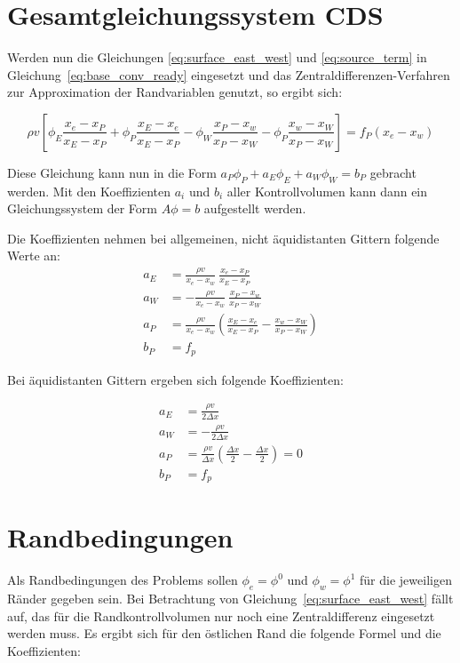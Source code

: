 \documentclass[11pt, ngerman,colorback,accentcolor=tud2d]{tudreport}
\begin{document}
\section{Gesamtgleichungssystem CDS}

Werden nun die Gleichungen \eqref{eq:surface_east_west} und \eqref{eq:source_term}
in Gleichung~\eqref{eq:base_conv_ready} eingesetzt und das Zentraldifferenzen-Verfahren
zur Approximation der Randvariablen genutzt, so ergibt sich:

\begin{equation*}
  \rho v \left[{\phi_E \frac{x_e-x_P}{x_E-x_P} + \phi_P \frac{x_E-x_e}{x_E-x_P}
  -\phi_W \frac{x_P-x_w}{x_P-x_W} - \phi_P \frac{x_w-x_W}{x_P-x_W}
  }\right]
  = f_P(x_e-x_w)
\end{equation*}

Diese Gleichung kann nun in die Form $a_P \phi_P + a_E \phi_E + a_W \phi_W = b_P$
gebracht werden. Mit den Koeffizienten $a_i$ und $b_i$ aller Kontrollvolumen kann
dann ein Gleichungssystem der Form $A\phi = b$ aufgestellt werden.

Die Koeffizienten nehmen bei allgemeinen, nicht äquidistanten Gittern folgende Werte
an:
\begin{align*}
  a_E &= \frac{\rho v}{x_e-x_w}\ \frac{x_e-x_P}{x_E-x_P}\\
  a_W &=-\frac{\rho v}{x_e-x_w}\ \frac{x_P-x_w}{x_P-x_W}\\
  a_P &= \frac{\rho v}{x_e-x_w} \left({\frac{x_E-x_e}{x_E-x_P}
-\frac{x_w-x_W}{x_P-x_W}}\right)\\
  b_P &= f_p
\end{align*}


Bei äquidistanten Gittern ergeben sich folgende Koeffizienten:

\begin{align*}
  a_E &= \frac{\rho v}{2\Delta x}\\
  a_W &=-\frac{\rho v}{2\Delta x}\\
  a_P &= \frac{\rho v}{\Delta x} \left({\frac{\Delta x}{2}
-\frac{\Delta x}{2}}\right) = 0\\
  b_P &= f_p
\end{align*}


\section{Randbedingungen}

Als Randbedingungen des Problems sollen $\phi_e = \phi^0$ und $\phi_w = \phi^1$ für die jeweiligen
Ränder gegeben sein. Bei Betrachtung von Gleichung~\eqref{eq:surface_east_west}
fällt auf, das für die Randkontrollvolumen nur noch eine Zentraldifferenz eingesetzt
werden muss. Es ergibt sich für den östlichen Rand die folgende Formel und die
Koeffizienten:
\end{document}
